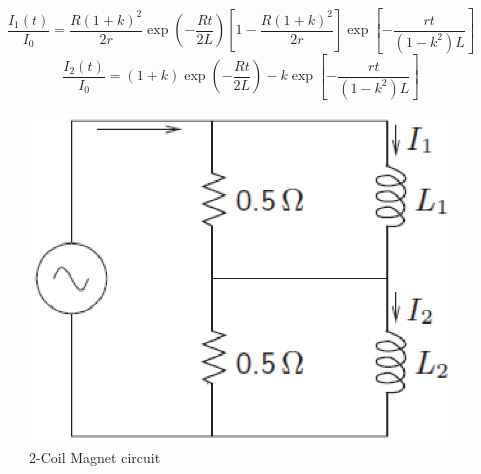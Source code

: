 \begin{equation}%
\frac{I_1(t)}{I_0}=\frac{R(1+k)^2}{2r}\exp\left(-\frac{Rt}{2L}\right)\left[1-\frac{R(1+k)^2}{2r}\right]\exp\left[-\frac{rt}{(1-k^2)L}\right]
\end{equation}
\begin{equation}%
\frac{I_2(t)}{I_0}=(1+k)\exp\left(-\frac{Rt}{2L}\right)-k\exp\left[-\frac{rt}{(1-k^2)L}\right]
\end{equation}


\begin{figure}
	\centering
	\includegraphics[scale=0.6]{chpt8/figs/fig8.14.eps}
	\caption{2-Coil Magnet circuit}
\end{figure}





